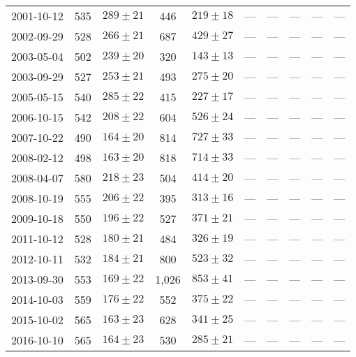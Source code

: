 \begin{landscape}
\begin{longtable}{cccccccccc}
{2001-10-12} & 535 & {$289  \pm  21$} & 446 & {$219 \pm 18$} & --- & --- & --- & --- & --- \\
{2002-09-29} & 528 & {$266  \pm  21$} & 687 & {$429 \pm 27$} & --- & --- & --- & --- & --- \\
{2003-05-04} & 502 & {$239  \pm  20$} & 320 & {$143 \pm 13$} & --- & --- & --- & --- & --- \\
{2003-09-29} & 527 & {$253  \pm  21$} & 493 & {$275 \pm 20$} & --- & --- & --- & --- & --- \\
{2005-05-15} & 540 & {$285  \pm  22$} & 415 & {$227 \pm 17$} & --- & --- & --- & --- & --- \\
{2006-10-15} & 542 & {$208  \pm  22$} & 604 & {$526 \pm 24$} & --- & --- & --- & --- & --- \\
{2007-10-22} & 490 & {$164  \pm  20$} & 814 & {$727 \pm 33$} & --- & --- & --- & --- & --- \\
{2008-02-12} & 498 & {$163  \pm  20$} & 818 & {$714 \pm 33$} & --- & --- & --- & --- & --- \\
{2008-04-07} & 580 & {$218  \pm  23$} & 504 & {$414 \pm 20$} & --- & --- & --- & --- & --- \\
{2008-10-19} & 555 & {$206  \pm  22$} & 395 & {$313 \pm 16$} & --- & --- & --- & --- & --- \\
{2009-10-18} & 550 & {$196  \pm  22$} & 527 & {$371 \pm 21$} & --- & --- & --- & --- & --- \\
{2011-10-12} & 528 & {$180  \pm  21$} & 484 & {$326 \pm 19$} & --- & --- & --- & --- & --- \\
{2012-10-11} & 532 & {$184  \pm  21$} & 800 & {$523 \pm 32$} & --- & --- & --- & --- & --- \\
{2013-09-30} & 553 & {$169  \pm  22$} & 1,026 & {$853 \pm 41$} & --- & --- & --- & --- & --- \\
{2014-10-03} & 559 & {$176  \pm  22$} & 552 & {$375 \pm 22$} & --- & --- & --- & --- & --- \\
{2015-10-02} & 565 & {$163  \pm  23$} & 628 & {$341 \pm 25$} & --- & --- & --- & --- & --- \\
{2016-10-10} & 565 & {$164  \pm  23$} & 530 & {$285 \pm 21$} & --- & --- & --- & --- & --- \\
\end{longtable} 
\end{landscape} 
